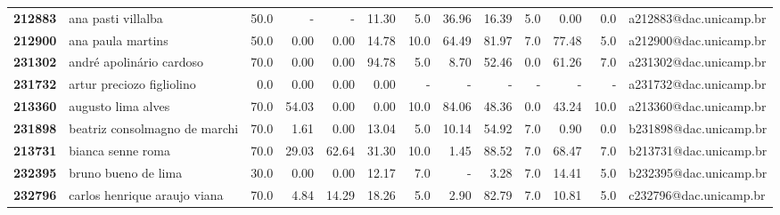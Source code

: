 \documentclass[11pt]{article}
\begin{document}
\begin{center}
\begin{landscape}
\begin{longtable}{llrrrrrrrrrrl}
\bottomrule
\endlastfoot
\textbf{212883} &                    ana pasti villalba &                  50.0 &           - &           - &       11.30 &                      5.0 &       36.96 &       16.39 &                        5.0 &        0.00 &                      0.0 &  a212883@dac.unicamp.br \\
\textbf{212900} &                     ana paula martins &                  50.0 &        0.00 &        0.00 &       14.78 &                     10.0 &       64.49 &       81.97 &                        7.0 &       77.48 &                      5.0 &  a212900@dac.unicamp.br \\
\textbf{231302} &              andré apolinário cardoso &                  70.0 &        0.00 &        0.00 &       94.78 &                      5.0 &        8.70 &       52.46 &                        0.0 &       61.26 &                      7.0 &  a231302@dac.unicamp.br \\
\textbf{231732} &             artur preciozo figliolino &                   0.0 &        0.00 &        0.00 &        0.00 &                        - &           - &           - &                          - &           - &                        - &  a231732@dac.unicamp.br \\
\textbf{213360} &                    augusto lima alves &                  70.0 &       54.03 &        0.00 &        0.00 &                     10.0 &       84.06 &       48.36 &                        0.0 &       43.24 &                     10.0 &  a213360@dac.unicamp.br \\
\textbf{231898} &         beatriz consolmagno de marchi &                  70.0 &        1.61 &        0.00 &       13.04 &                      5.0 &       10.14 &       54.92 &                        7.0 &        0.90 &                      0.0 &  b231898@dac.unicamp.br \\
\textbf{213731} &                     bianca senne roma &                  70.0 &       29.03 &       62.64 &       31.30 &                     10.0 &        1.45 &       88.52 &                        7.0 &       68.47 &                      7.0 &  b213731@dac.unicamp.br \\
\textbf{232395} &                   bruno bueno de lima &                  30.0 &        0.00 &        0.00 &       12.17 &                      7.0 &           - &        3.28 &                        7.0 &       14.41 &                      5.0 &  b232395@dac.unicamp.br \\
\textbf{232796} &          carlos henrique araujo viana &                  70.0 &        4.84 &       14.29 &       18.26 &                      5.0 &        2.90 &       82.79 &                        7.0 &       10.81 &                      5.0 &  c232796@dac.unicamp.br \\

\end{longtable}
\end{landscape}
\end{center}
\end{document}
